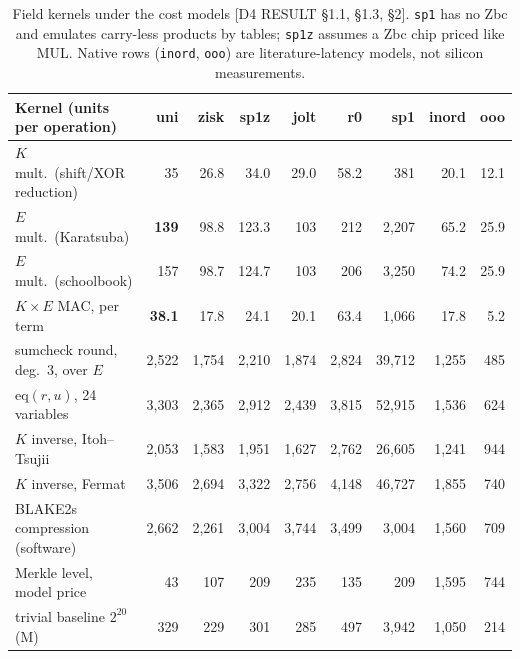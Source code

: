 \begin{table}[t]
\centering\footnotesize
\setlength{\tabcolsep}{3pt}
\begin{tabular}{@{}lrrrrrrrr@{}}
\toprule
Kernel (units per operation) & uni & zisk & sp1z & jolt & r0 & sp1 & inord & ooo \\
\midrule
$K$ mult.\ (shift/XOR reduction) & 35 & 26.8 & 34.0 & 29.0 & 58.2 & 381 & 20.1 & 12.1 \\
$E$ mult.\ (Karatsuba) & \textbf{139} & 98.8 & 123.3 & 103 & 212 & 2{,}207 & 65.2 & 25.9 \\
$E$ mult.\ (schoolbook) & 157 & 98.7 & 124.7 & 103 & 206 & 3{,}250 & 74.2 & 25.9 \\
$K\times E$ MAC, per term & \textbf{38.1} & 17.8 & 24.1 & 20.1 & 63.4 & 1{,}066 & 17.8 & 5.2 \\
sumcheck round, deg.\ 3, over $E$ & 2{,}522 & 1{,}754 & 2{,}210 & 1{,}874 & 2{,}824 & 39{,}712 & 1{,}255 & 485 \\
$\mathrm{eq}(r,u)$, 24 variables & 3{,}303 & 2{,}365 & 2{,}912 & 2{,}439 & 3{,}815 & 52{,}915 & 1{,}536 & 624 \\
$K$ inverse, Itoh--Tsujii & 2{,}053 & 1{,}583 & 1{,}951 & 1{,}627 & 2{,}762 & 26{,}605 & 1{,}241 & 944 \\
$K$ inverse, Fermat & 3{,}506 & 2{,}694 & 3{,}322 & 2{,}756 & 4{,}148 & 46{,}727 & 1{,}855 & 740 \\
BLAKE2s compression (software) & 2{,}662 & 2{,}261 & 3{,}004 & 3{,}744 & 3{,}499 & 3{,}004 & 1{,}560 & 709 \\
Merkle level, model price & 43 & 107 & 209 & 235 & 135 & 209 & 1{,}595 & 744 \\
trivial baseline $2^{20}$ (M) & 329 & 229 & 301 & 285 & 497 & 3{,}942 & 1{,}050 & 214 \\
\bottomrule
\end{tabular}
\caption{Field kernels under the cost models [D4 RESULT §1.1, §1.3, §2]. \texttt{sp1} has no Zbc and
emulates carry-less products by tables; \texttt{sp1z} assumes a Zbc chip priced like MUL. Native rows
(\texttt{inord}, \texttt{ooo}) are literature-latency models, not silicon measurements.}
\label{tab:cost-field}
\end{table}

